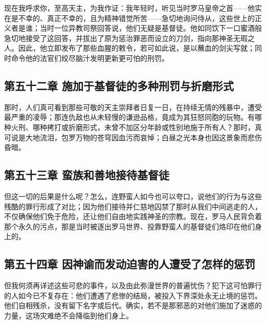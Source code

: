 现在我呼求你，至高天主，为我作证：我年轻时，听见当时罗马皇帝之首——他实在是不幸的、真正不幸的，且为精神错觉所苦——急切地询问侍从，这些世上的正义者是谁；当时一位异教司祭回答说，他们无疑是基督徒。他如同饮下一口蜜酒般急切地接受了这回答，并拔出了原为惩治罪恶而设立的刀剑，指向那神圣无瑕之人。因此，他立即发布了那些血腥的敕令，若可如此说，是以蘸血的剑尖写就；同时命令他的法官们绞尽脑汁发明更新更可怕的刑罚。\par


\subsection{第五十二章 施加于基督徒的多种刑罚与折磨形式}

那时，人们真可看到那些可敬的天主崇拜者日复一日，在持续无情的残暴中，遭受最严重的凌辱；那连仇敌也从未轻慢的谦逊品格，竟成为其狂怒同胞的玩物。有哪种火刑、哪种拷打或折磨形式，未曾不加区分年龄或性别地施于所有人？那时，真可说是大地流泪，包罗万物的苍穹因血污而哀悼；白昼之光本身也因这景象而悲伤昏暗。\par


\subsection{第五十三章 蛮族和善地接待基督徒}

但这一切的后果是什么呢？怎么，连野蛮人如今也可以夸口，说他们的行为与这些残酷的罪行形成了对比；因为他们接待并仁慈地囚禁了那时从我们中间逃走的人，不仅确保他们免于危险，还让他们自由地实践神圣的宗教。现在，罗马人民背负着那个永久的污点，那是当时被逐出罗马世界、投靠野蛮人的基督徒们烙印在他们身上的。\par


\subsection{第五十四章 因神谕而发动迫害的人遭受了怎样的惩罚}

但我何须再详述这些可悲的事件，以及由此弥漫世界的普遍忧伤？犯下这可怕罪行的人如今已不复存在：他们遭遇了悲惨的结局，被投入下界深处永无止境的惩罚。他们自相残杀，没有留下名字或后代。确实，若不是那邪恶的对他们施加了迷惑的力量，这场灾难绝不会降临到他们身上。\par

